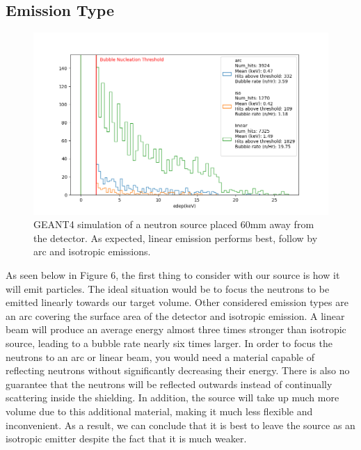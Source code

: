 \documentclass[%
12pt,
twoside,
reprint,
amsmath,amssymb,
aps,
]{article}
\begin{document}
	\subsection{Emission Type}
	\begin{figure}[!b]
		\includegraphics[scale = 0.6, center]{Images/emission_normalized.png}
		\caption{\label{tab:table-name} GEANT4 simulation of a neutron source placed 60mm away from the detector. As expected, linear emission performs best, follow by arc and isotropic emissions.}
	\end{figure}
	\par As seen below in Figure 6, the first thing to consider with our source is how it will emit particles. The ideal situation would be to focus the neutrons to be emitted linearly towards our target volume. Other considered emission types are an arc covering the surface area of the detector and isotropic emission. A linear beam will produce an average energy almost three times stronger than isotropic source, leading to a bubble rate nearly six times larger. In order to focus the neutrons to an arc or linear beam, you would need a material capable of reflecting neutrons without significantly decreasing their energy. There is also no guarantee that the neutrons will be reflected outwards instead of continually scattering inside the shielding. In addition, the source will take up much more volume due to this additional material, making it much less flexible and inconvenient. As a result, we can conclude that it is best to leave the source as an isotropic emitter despite the fact that it is much weaker.
\end{document}
